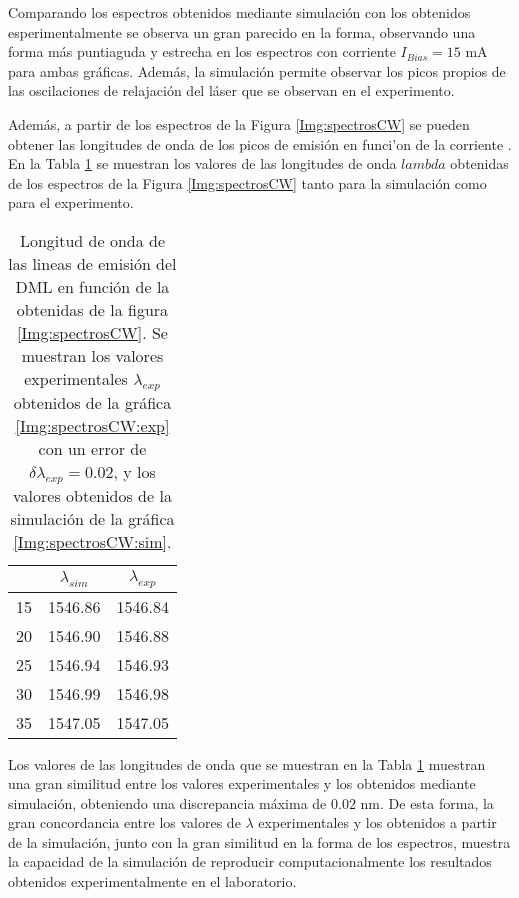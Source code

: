 		Comparando los espectros obtenidos mediante simulación con los obtenidos esperimentalmente se observa un gran parecido en la forma, observando una forma m\'as puntiaguda y estrecha en los espectros con corriente $I_{Bias}= 15$ mA para ambas gr\'aficas. Adem\'as, la simulación permite observar los picos propios de las oscilaciones de relajaci\'on del l\'aser que se observan en el experimento.

		Adem\'as, a partir de los espectros de la Figura \ref{Img:spectrosCW} se pueden obtener las longitudes de onda de los picos de emisión en funci'on de la corriente \ibias. En la Tabla \ref{tab:lambdas} se muestran los valores de las longitudes de onda $lambda$ obtenidas de los espectros de la Figura \ref{Img:spectrosCW} tanto para la simulaci\'on como para el experimento.

		\begin{table}[H]
			\centering
			\begin{tabular}{c c c}
				\hline
				\ibias & $\lambda_{sim}$ & $\lambda_{exp}$ \\\hline 
				15 & 1546.86 & 1546.84 \\
				20 & 1546.90 & 1546.88 \\
				25 & 1546.94 & 1546.93 \\
				30 & 1546.99 & 1546.98 \\
				35 & 1547.05 & 1547.05 \\\hline
			\end{tabular}
			\caption{\label{tab:lambdas}Longitud de onda de las lineas de emisión del DML en función de la \ibias obtenidas de la figura \ref{Img:spectrosCW}. Se muestran los valores experimentales $\lambda_{exp}$ obtenidos de la gráfica \ref{Img:spectrosCW:exp} con un error de $\delta\lambda_{exp} = 0.02$, y los valores obtenidos de la simulación de la gráfica \ref{Img:spectrosCW:sim}.}
		\end{table}

	Los valores de las longitudes de onda que se muestran en la Tabla \ref{tab:lambdas} muestran una gran similitud entre los valores experimentales y los obtenidos mediante simulación, obteniendo una discrepancia m\'axima de $0.02$ nm. De esta forma, la gran concordancia entre los valores de $\lambda$ experimentales y los obtenidos a partir de la simulaci\'on, junto con la gran similitud en la forma de los espectros, muestra la capacidad de la simulaci\'on de reproducir computacionalmente los resultados obtenidos experimentalmente en el laboratorio.

